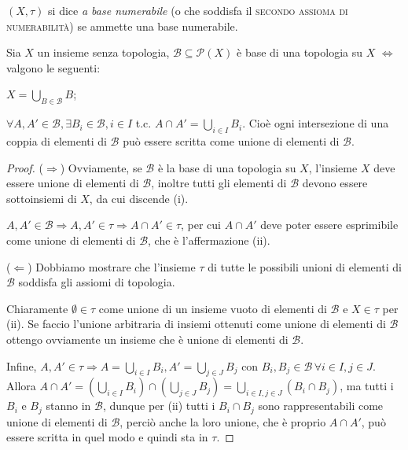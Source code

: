 \documentclass{article}
\begin{document}
\begin{defn} \label{N2}
	$(X, \tau)$ si dice \textit{a base numerabile} (o che soddisfa il
	\textsc{secondo assioma di numerabilità}) se ammette una base numerabile.
\end{defn}

\begin{prop} \label{prop:base}
	Sia $X$ un insieme senza topologia, $\mathcal{B} \subseteq \mathcal{P}(X)$ è
	base di una topologia su $X$ $\Leftrightarrow$ valgono le seguenti:
	\begin{nlist}
		\item \label{i_prop} $\displaystyle X=\bigcup_{B \in \mathcal{B}} B$;
		\item $\forall A, A' \in \mathcal{B}, \exists B_i \in \mathcal{B}, i \in
		I$ t.c. $A \cap A'= \bigcup_{i \in I} B_i$. Cio\`e ogni intersezione di
		una coppia di elementi di $\mathcal{B}$ pu\`o essere scritta come unione
		di elementi di $\mathcal{B}$.
	\end{nlist}
\end{prop}

\begin{proof} \label{prop:preb}
    ($\Rightarrow$) Ovviamente, se $\mathcal{B}$ è la base di una topologia su
    $X$, l'insieme $X$ deve essere unione di elementi di $\mathcal{B}$, inoltre
    tutti gli elementi di $\mathcal{B}$ devono essere sottoinsiemi di $X$, da
    cui discende (i).

	$A, A' \in \mathcal{B} \Rightarrow A, A' \in \tau \Rightarrow A \cap A' \in
	\tau$, per cui $A \cap A'$ deve poter essere esprimibile come unione di
	elementi di $\mathcal{B}$, che è l'affermazione (ii).

	($\Leftarrow$) Dobbiamo mostrare che l'insieme $\tau$ di tutte le possibili
	unioni di elementi di $\mathcal{B}$ soddisfa gli assiomi di topologia.

	Chiaramente $\emptyset \in \tau$ come unione di un insieme vuoto di elementi
	di $\mathcal{B}$ e $X \in \tau$ per (ii).  Se faccio l'unione arbitraria di
	insiemi ottenuti come unione di elementi di $\mathcal{B}$ ottengo ovviamente
	un insieme che è unione di elementi di $\mathcal{B}$.

	Infine, $\displaystyle A, A' \in \tau \Rightarrow A=\bigcup_{i \in I} B_i,
	A'=\bigcup_{j \in J} B_j$ con $B_i, B_j \in \mathcal{B} \, \forall i \in I,
	j \in J$. Allora $\displaystyle A \cap A'= \left(\bigcup_{i \in I} B_i
	\right) \cap \left(\bigcup_{j \in J} B_j \right)=\bigcup_{i \in I, j \in J}
	(B_i \cap B_j)$, ma tutti i $B_i$ e $B_j$ stanno in $\mathcal{B}$, dunque
	per (ii) tutti i $B_i \cap B_j$ sono rappresentabili come unione di elementi
	di $\mathcal{B}$, perciò anche la loro unione, che è proprio $A \cap A'$,
	può essere scritta in quel modo e quindi sta in $\tau$.
\end{proof}
\end{document}
